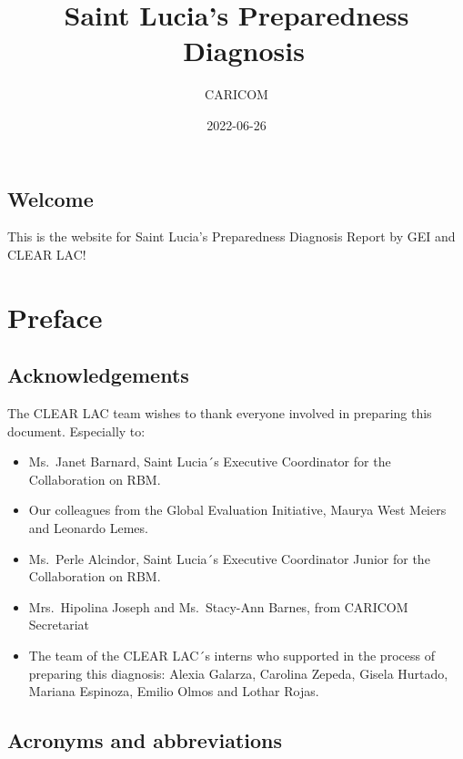 \documentclass[
  10pt,
]{book}
\title{Saint Lucia's Preparedness ~Diagnosis}
\author{CARICOM}
\date{2022-06-26}
\begin{document}
\maketitle

{
\setcounter{tocdepth}{1}
\tableofcontents
}
\hypertarget{welcome}{%
\chapter*{Welcome}\label{welcome}}

This is the website for Saint Lucia's Preparedness Diagnosis Report by GEI and CLEAR LAC!

\hypertarget{part-preface}{%
\part{Preface}\label{part-preface}}

\hypertarget{acknowledgements}{%
\chapter*{Acknowledgements}\label{acknowledgements}}

The CLEAR LAC team wishes to thank everyone involved in preparing this document. Especially to:

\begin{itemize}
\item
  Ms.~Janet Barnard, Saint Lucia´s Executive Coordinator for the Collaboration on RBM.
\item
  Our colleagues from the Global Evaluation Initiative, Maurya West Meiers and Leonardo Lemes.
\item
  Ms.~Perle Alcindor, Saint Lucia´s Executive Coordinator Junior for the Collaboration on RBM.
\item
  Mrs.~Hipolina Joseph and Ms.~Stacy-Ann Barnes, from CARICOM Secretariat
\item
  The team of the CLEAR LAC´s interns who supported in the process of preparing this diagnosis: Alexia Galarza, Carolina Zepeda, Gisela Hurtado, Mariana Espinoza, Emilio Olmos and Lothar Rojas.
\end{itemize}

\hypertarget{acronyms-and-abbreviations}{%
\chapter*{Acronyms and abbreviations}\label{acronyms-and-abbreviations}}
\end{document}
